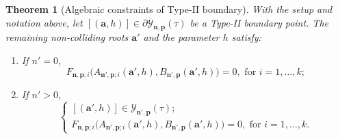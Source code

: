 \documentclass[11pt]{amsart}
\newtheorem{theorem}{Theorem}[section]
\theoremstyle{remark}
\numberwithin{equation}{section}
\begin{document}
\begin{theorem}[Algebraic constraints of Type-II boundary] \label{special-pt-II}
With the setup and notation above, let $[(\mathbf{a},h)] \in \partial\overline{\mathcal{Y}}_{\mathbf{n},\mathbf{p}}(\tau)$ be a Type-II boundary point. The remaining non-colliding roots $\mathbf{a}'$ and the parameter $h$ satisfy:
\begin{enumerate}
    \item If $n'=0$, 
    \[
        F_{\mathbf{n},\mathbf{p};i}\Big(A_{\mathbf{n}',\mathbf{p};i}(\mathbf{a}',h),B_{\mathbf{n}',\mathbf{p}}(\mathbf{a}',h)\Big)=0, \text{ for }i=1,\dots,k;
    \]
    \item If $n'>0$, 
    \[
    \begin{cases}
        [(\mathbf{a}',h)] \in \mathcal{Y}_{\mathbf{n}', \mathbf{p}}(\tau);
        \\
        F_{\mathbf{n},\mathbf{p};i}\Big(A_{\mathbf{n}',\mathbf{p};i}(\mathbf{a}',h),B_{\mathbf{n}',\mathbf{p}}(\mathbf{a}',h)\Big)=0, \text{ for }i=1,\dots,k.
    \end{cases}
    \]
\end{enumerate}
\end{theorem}
\end{document}
